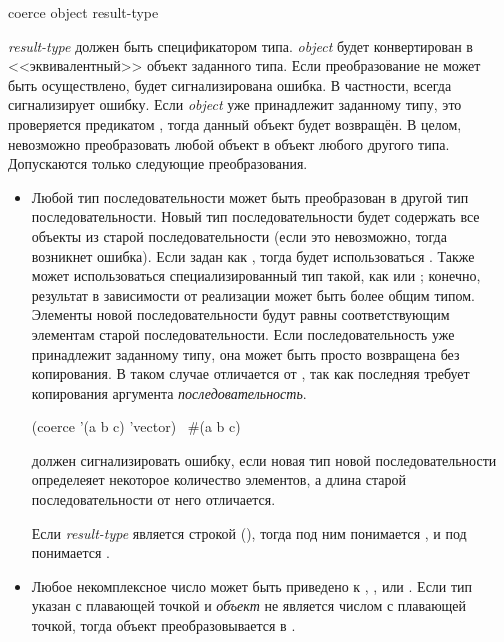 \begin{defun}[Функция]
coerce object result-type

\emph{result-type} должен быть спецификатором типа. \emph{object} будет
конвертирован в <<эквивалентный>> объект заданного типа.
Если преобразование не может быть осуществлено, будет сигнализирована ошибка.
В частности,  всегда сигнализирует ошибку.
Если \emph{object} уже принадлежит заданному типу, это проверяется предикатом
, тогда данный объект будет возвращён.
В целом, невозможно преобразовать любой объект в объект любого другого
типа. Допускаются только следующие преобразования.
\begin{itemize}
\item Любой тип последовательности может быть преобразован в другой
  тип последовательности. Новый тип последовательности будет содержать
  все объекты из старой последовательности (если это невозможно, тогда
  возникнет ошибка). Если  задан как ,
  тогда будет использоваться . Также может
  использоваться специализированный тип такой, как  или
  ; конечно, результат в
  зависимости от реализации может быть более общим типом.  Элементы
  новой последовательности будут равны  соответствующим
  элементам старой последовательности.  Если последовательность уже
  принадлежит заданному типу, она может быть просто возвращена без
  копирования. В таком случае  отличается от , так как последняя требует копирования
  аргумента \emph{последовательность}.

  \begin{lisp}
    (coerce '(a b c) 'vector) \EV\ \#(a b c)
  \end{lisp}

   должен сигнализировать ошибку, если новая тип новой
  последовательности определеяет некоторое количество элементов, а
  длина старой последовательности от него отличается.

  Если \emph{result-type} является строкой (), тогда под
  ним понимается , и под 
  понимается .

\item Любое некомплексное число может быть приведено к
  , ,  или
  . Если тип указан с плавающей точкой и \emph{объект}
  не является числом с плавающей точкой, тогда объект
  преобразовывается в .


\end{itemize}
\end{defun}
